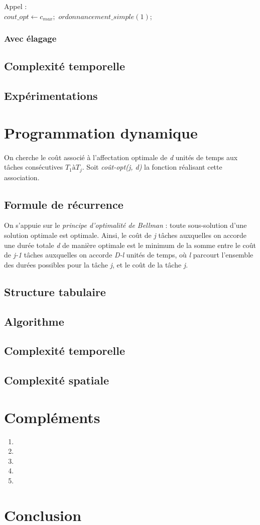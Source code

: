 \documentclass[a4paper, titlepage]{article}
\begin{document}
			\noindent
			Appel :\\
			$cout\_opt \leftarrow c_{max};$ $ordonnancement\_simple(1)$;

		\subsubsection{Avec élagage}

	\subsection{Complexité temporelle}

	\subsection{Expérimentations}

\section{Programmation dynamique}
	\paragraph{}
		On cherche le coût associé à l'affectation optimale de \emph{d} unités de temps aux tâches consécutives $T_{1} à T_{j}$. Soit \emph{coût-opt(j, d)} la fonction réalisant cette association.
		
	\subsection{Formule de récurrence}
		On s'appuie sur le \emph{principe d'optimalité de Bellman} : toute sous-solution d'une solution optimale est optimale. Ainsi, le coût de \emph{j} tâches auxquelles on accorde une durée totale \emph{d} de manière optimale est le minimum de la somme entre le coût de \emph{j-1} tâches auxquelles on accorde \emph{D-l} unités de temps, où \emph{l} parcourt l'ensemble des durées possibles pour la tâche \emph{j}, et le coût de la tâche \emph{j}.
	\subsection{Structure tabulaire}
	\subsection{Algorithme}
	\subsection{Complexité temporelle}
	\subsection{Complexité spatiale}

\section{Compléments}
\begin{enumerate}
\item
\item
\item
\item
\item
\end{enumerate}

\section{Conclusion}
\end{document}
